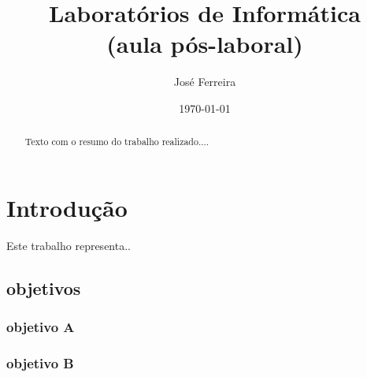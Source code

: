 \documentclass[a4wide]{report}
\title{Laboratórios de Informática \\ (aula pós-laboral)} %
\author{José Ferreira}
\date{\today}     %
\begin{document}
\maketitle

\begin{abstract}
Texto com o resumo do trabalho realizado....
\end{abstract}


\chapter{Introdução}

Este trabalho representa..

\section{objetivos}

\subsection{objetivo A}
\subsection{objetivo B}
\end{document}
